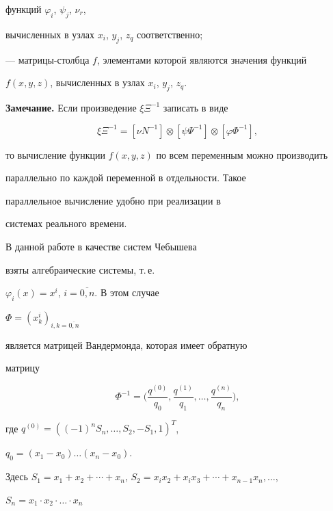 функций $\varphi_i$, $\psi_j$, $\nu_r$,


вычисленных в узлах $x_i$, $y_j$, $z_q$ соответственно;





--- матрицы-столбца $f$, элементами которой  являются значения функций


$f(x,y,z)$, вычисленных в узлах $x_i$, $y_j$, $z_q$.


\medskip





{\bf Замечание.} Если произведение $\xi\Xi^{-1}$  записать в виде


$$


\xi\Xi^{-1}=[\nu N^{-1}]\otimes[\psi\Psi^{-1}]\otimes


[\varphi\Phi^{-1}],


$$


то вычисление функции $f(x,y,z)$ по всем переменным можно производить


параллельно по каждой переменной в отдельности. Такое


параллельное вычисление удобно при реализации в


системах реального времени.


\medskip





В данной работе в качестве систем Чебышева


взяты алгебраические системы, т.\,е.


$\varphi_i(x)=x^i$, $i=\overline{0,n}$. В этом случае


$\Phi =(x^i_{k})_{i,k=\overline{0,n}}$


является матрицей Вандермонда, которая имеет обратную


матрицу


$$


\Phi^{-1}=\bigg( \frac{q^{(0)}}{q_0},\frac{q^{(1)}}{q_1},\dotsc,


\frac{q^{(n)}}{q_n}\bigg) ,


$$


где $q^{(0)} =((-1)^nS_n,\dotsc,S_2,-S_1,1)^{T}$,


$q_0=(x_1-x_0)\dotsc (x_n-x_0).$


Здесь $S_1=x_1+x_2+\dotsb +x_n$, $S_2=x_ix_2+x_ix_3+


\dotsb +x_{n-1}x_n,\dotsc$,


$S_n=x_1\cdot x_2\cdot\dotsc\cdot x_n$


